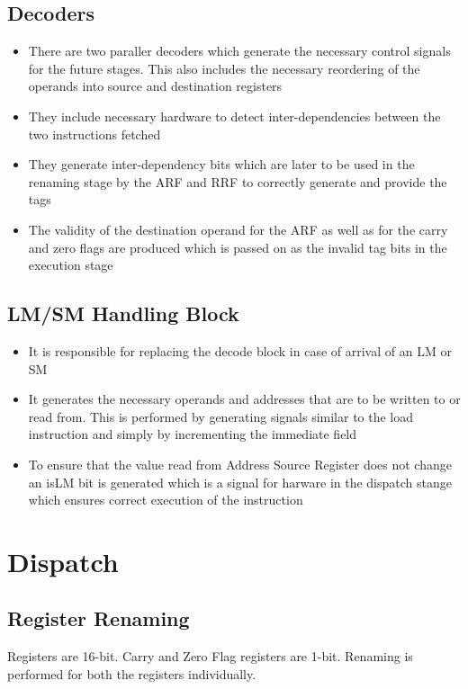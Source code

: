 \documentclass{article}
\begin{document}
\subsection{Decoders}
\begin{itemize}
\item There are two paraller decoders which generate the necessary control signals for the future stages. This also includes the necessary reordering of the operands into source and destination registers
\item They include necessary hardware to detect inter-dependencies between the two instructions fetched
\item They generate inter-dependency bits which are later to be used in the renaming stage by the ARF and RRF to correctly generate and provide the tags
\item The validity of the destination operand for the ARF as well as for the carry and zero flags are produced which is passed on as the invalid tag bits in the execution stage
\end{itemize}
\subsection{LM/SM Handling Block}
\begin{itemize}
\item It is responsible for replacing the decode block in case of arrival of an LM or SM
\item It generates the necessary operands and addresses that are to be written to or read from. This is performed by generating signals similar to the load instruction and simply by incrementing the immediate field
\item To ensure that the value read from Address Source Register does not change an isLM bit is generated which is a signal for harware in the dispatch stange which ensures correct execution of the instruction
\end{itemize}

\section{Dispatch}
\subsection{Register Renaming}
Registers are 16-bit.
Carry and Zero Flag registers are 1-bit.
Renaming is performed for both the registers individually.
\end{document}
